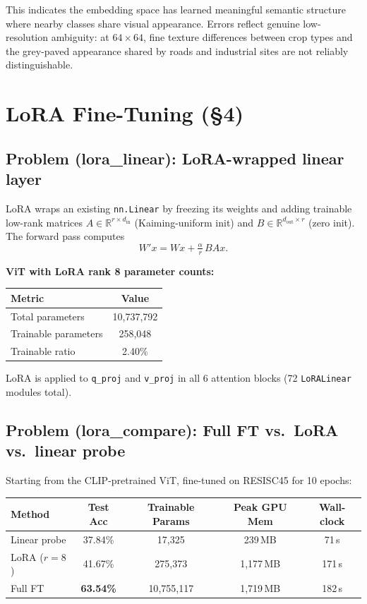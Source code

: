 \documentclass[11pt]{article}
\newcommand{\R}{\mathbb{R}}
\begin{document}
This indicates the embedding space has learned meaningful semantic structure where nearby classes share visual appearance. Errors reflect genuine low-resolution ambiguity: at $64{\times}64$, fine texture differences between crop types and the grey-paved appearance shared by roads and industrial sites are not reliably distinguishable.

\section{LoRA Fine-Tuning (\S4)}

\subsection*{Problem (lora\_linear): LoRA-wrapped linear layer}

LoRA wraps an existing \texttt{nn.Linear} by freezing its weights and adding trainable low-rank matrices $A \in \R^{r \times d_{\mathrm{in}}}$ (Kaiming-uniform init) and $B \in \R^{d_{\mathrm{out}} \times r}$ (zero init). The forward pass computes
\[
W'x = Wx + \tfrac{\alpha}{r}\,BAx.
\]

\textbf{ViT with LoRA rank 8 parameter counts:}

\begin{center}
\begin{tabular}{lc}
\toprule
Metric & Value \\
\midrule
Total parameters     & 10{,}737{,}792 \\
Trainable parameters & 258{,}048 \\
Trainable ratio      & 2.40\% \\
\bottomrule
\end{tabular}
\end{center}

LoRA is applied to \texttt{q\_proj} and \texttt{v\_proj} in all 6 attention blocks (72 \texttt{LoRALinear} modules total).

\subsection*{Problem (lora\_compare): Full FT vs.\ LoRA vs.\ linear probe}

Starting from the CLIP-pretrained ViT, fine-tuned on RESISC45 for 10 epochs:

\begin{center}
\begin{tabular}{lcccc}
\toprule
Method & Test Acc & Trainable Params & Peak GPU Mem & Wall-clock \\
\midrule
Linear probe & 37.84\% & 17{,}325 & 239\,MB & 71\,s \\
LoRA ($r{=}8$) & 41.67\% & 275{,}373 & 1{,}177\,MB & 171\,s \\
Full FT & \textbf{63.54\%} & 10{,}755{,}117 & 1{,}719\,MB & 182\,s \\
\bottomrule
\end{tabular}
\end{center}
\end{document}
